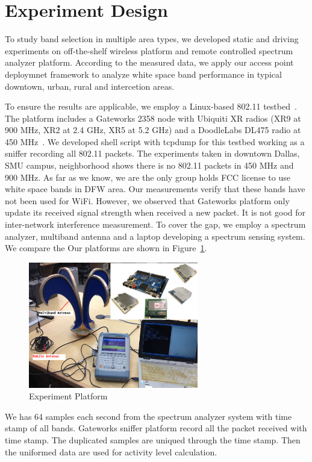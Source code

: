 \section{Experiment Design}
\label{sec:experimentdesign}

To study band selection in multiple area types, we developed static and driving experiments 
on off-the-shelf wireless platform and remote controlled spectrum analyzer platform.
According to the measured data, we apply our access point deploymnet framework to analyze
 white space band performance in typical downtown, urban, rural and intercetion areas.


To ensure the results are applicable, we employ a Linux-based 802.11 testbed~\cite{Gateworks}.
The platform includes a Gateworks 2358 node with Ubiquiti XR radios (XR9 at 900 MHz, 
XR2 at 2.4 GHz, XR5 at 5.2 GHz) and a DoodleLabs DL475 radio at 450 MHz~\cite{Ubnt,Gateworks}.
We developed shell script with tcpdump for this testbed working as a sniffer recording all 
802.11 packets.
The experiments taken in downtown Dallas, SMU campus, neighborhood shows there is no 802.11
packets in 450 MHz and 900 MHz. As far as we know, we are the only group holds FCC license
 to use white space bands in DFW area. Our measurements verify that these bands have not been 
 used for WiFi.
 However, we observed that Gateworks platform only update its received signal strength when received
  a new packet. It is not good for inter-network interference measurement. 
  To cover the gap, we employ a spectrum analyzer, multiband antenna and a laptop developing a spectrum sensing 
  system. We compare the 
  Our platforms are shown in Figure~\ref{fig:equipment}.
  \begin{figure}
  \centering
  \includegraphics[width=74mm]{figures/equipment}
  \vspace{-0.1in}
  \caption{Experiment Platform}                                                                 
  \label{fig:equipment}
  \end{figure}
We has 64 samples each second from the spectrum analyzer system with time stamp of all bands.
Gateworks sniffer platform record all the packet received with time stamp. The duplicated 
samples are uniqued through the time stamp. Then the uniformed data are used for activity level
 calculation.  

